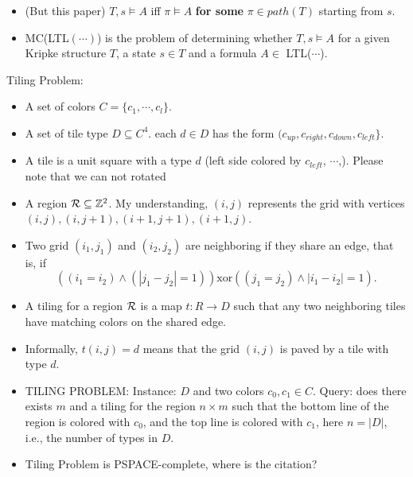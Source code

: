 \documentclass[12pt]{article}
\begin{document}
\begin{CJK*}{GBK}{song}
\begin{itemize}
\item (But this paper) $T,s\models A$ iff $\pi\models A$ {\bf for some} $\pi\in path(T)$ starting from $s$.

\item MC(LTL$(\cdots)$) is the problem of determining whether $T,s\models A$ for a given Kripke structure $T$, a state $s\in T$ and a formula $A\in$ LTL($\cdots$).
\end{itemize}

Tiling Problem:

\begin{itemize}
\item A set of colors $C=\{c_1,\cdots, c_l\}$.

\item A set of tile type $D\subseteq C^4$. each $d\in D$ has the form $(c_{up},c_{right}, c_{down},c_{left}\}$.

\item A tile is a unit square with a type $d$ (left side colored by $c_{left}$, $\cdots$,). Please note that we can not rotated

\item A region ${\cal R}\subseteq \mathbb{Z}^2$. My understanding, $(i,j)$ represents the grid with vertices $(i,j), (i,j+1), (i+1,j+1), (i+1,j)$.

\item Two grid $(i_1,j_1)$ and $(i_2,j_2)$ are neighboring if they share an edge, that is,  if $$((i_1=i_2)\wedge (|j_1-j_2|=1)) \mbox{xor} ((j_1=j_2)\wedge |i_1-i_2|=1).$$

\item A tiling for a region ${\cal R}$ is a map $t: R\rightarrow D$ such that any two neighboring tiles have matching colors on the shared edge.

\item Informally, $t(i,j)=d$ means that the grid $(i,j)$ is paved by a tile with type $d$.

\item TILING PROBLEM: Instance: $D$ and two colors $c_0, c_1\in C$. Query: does there exists $m$ and a tiling for the region $n\times m$ such that the bottom line of the region is colored with $c_0$, and the top line is colored with $c_1$, here $n=|D|$, i.e., the number of types in $D$. %

\item Tiling Problem is PSPACE-complete, where is the citation?
\end{itemize}


\end{CJK*}
\end{document}
